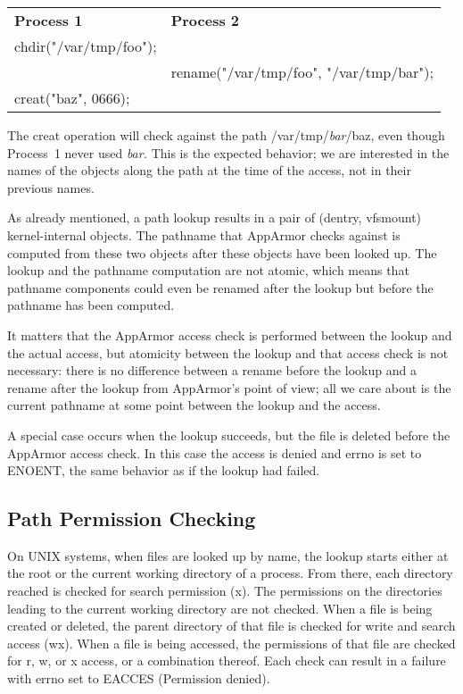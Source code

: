 \documentclass[a4paper]{article}
\begin{document}
\begin{tabbing}
\begin{tabular}{ll}
\textbf{Process 1}		& \textbf{Process 2} \\
chdir("/var/tmp/foo"); & \\
			& rename("/var/tmp/foo", "/var/tmp/bar"); \\
creat("baz", 0666); 	& \\
\end{tabular}
\end{tabbing}

The creat operation will check against the path
/var/tmp/\textit{bar}/baz, even though Process~1 never used
\textit{bar.}  This is the expected behavior; we are interested in the
names of the objects along the path at the time of the access, not in
their previous names.

As already mentioned, a path lookup results in a pair of (dentry,
vfsmount) kernel-internal objects.  The pathname that AppArmor checks
against is computed from these two objects after these objects have been
looked up. The lookup and the pathname computation are not atomic, which
means that pathname components could even be renamed after the lookup
but before the pathname has been computed.

It matters that the AppArmor access check is performed between the lookup and
the actual access, but atomicity between the lookup and that access
check is not necessary: there is no difference between a rename before
the lookup and a rename after the lookup from AppArmor's point of view;
all we care about is the current pathname at some point between the
lookup and the access.

A special case occurs when the lookup succeeds, but the file is deleted
before the AppArmor access check. In this case the access is denied and
errno is set to ENOENT, the same behavior as if the lookup had failed.


\subsection{Path Permission Checking}

On UNIX systems, when files are looked up by name, the lookup starts
either at the root or the current working directory of a process.  From
there, each directory reached is checked for search permission (x).  The
permissions on the directories leading to the current working directory
are not checked.  When a file is being created or deleted, the parent
directory of that file is checked for write and search access (wx).
When a file is being accessed, the permissions of that file are checked
for r, w, or x access, or a combination thereof.  Each check can result
in a failure with errno set to EACCES (Permission denied).
\end{document}
